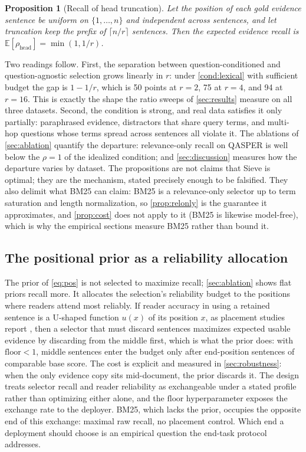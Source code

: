 \documentclass[pdflatex,sn-basic]{sn-jnl}
\newtheorem{proposition}{Proposition}
\theoremstyle{remark}
\newcommand{\method}{Sieve}
\begin{document}
\begin{proposition}[Recall of head truncation]
\label{prop:head}
Let the position of each gold evidence sentence be uniform on
$\{1, \ldots, n\}$ and independent across sentences, and let
truncation keep the prefix of $\lceil n/r \rceil$ sentences. Then the
expected evidence recall is
$\mathbb{E}[\rho_{\mathrm{head}}] = \min(1, 1/r)$.
\end{proposition}

Two readings follow. First, the separation between question-conditioned
and question-agnostic selection grows linearly in $r$: under
\autoref{cond:lexical} with sufficient budget the gap is $1 - 1/r$,
which is 50 points at $r=2$, 75 at $r=4$, and 94 at $r=16$. This is
exactly the shape the ratio sweeps of \autoref{sec:results} measure on
all three datasets. Second, the condition is strong, and real data
satisfies it only partially: paraphrased evidence, distractors that
share query terms, and multi-hop questions whose terms spread across
sentences all violate it. The ablations of \autoref{sec:ablation}
quantify the departure: relevance-only recall on QASPER is well below
the $\rho = 1$ of the idealized condition; and \autoref{sec:discussion}
measures how the departure varies by dataset. The propositions are
not claims that \method{} is optimal; they are the mechanism, stated
precisely enough to be falsified. They also delimit what BM25 can
claim: BM25 is a relevance-only selector up to term saturation and
length normalization, so \autoref{prop:relonly} is the guarantee it
approximates, and \autoref{prop:cost} does not apply to it (BM25 is
likewise model-free), which is why the empirical sections measure BM25
rather than bound it.

\subsection{The positional prior as a reliability allocation}
The prior of \eqref{eq:pos} is not selected to maximize recall;
\autoref{sec:ablation} shows flat priors recall more. It allocates the
selection's reliability budget to the positions where readers attend
most reliably. If reader accuracy in using a retained sentence is a
U-shaped function $u(x)$ of its position $x$, as placement studies
report \citep{liu2023lost}, then a selector that must discard
sentences maximizes expected usable evidence by discarding from the
middle first, which is what the prior does: with
$\mathrm{floor} < 1$, middle sentences enter the budget only after
end-position sentences of comparable base score. The cost is explicit
and measured in \autoref{sec:robustness}: when the only evidence copy
sits mid-document, the prior discards it. The design treats selector
recall and reader reliability as exchangeable under a stated profile
rather than optimizing either alone, and the $\mathrm{floor}$
hyperparameter exposes the exchange rate to the deployer. BM25, which
lacks the prior, occupies the opposite end of this exchange: maximal
raw recall, no placement control. Which end a deployment should choose
is an empirical question the end-task protocol addresses.
\end{document}
